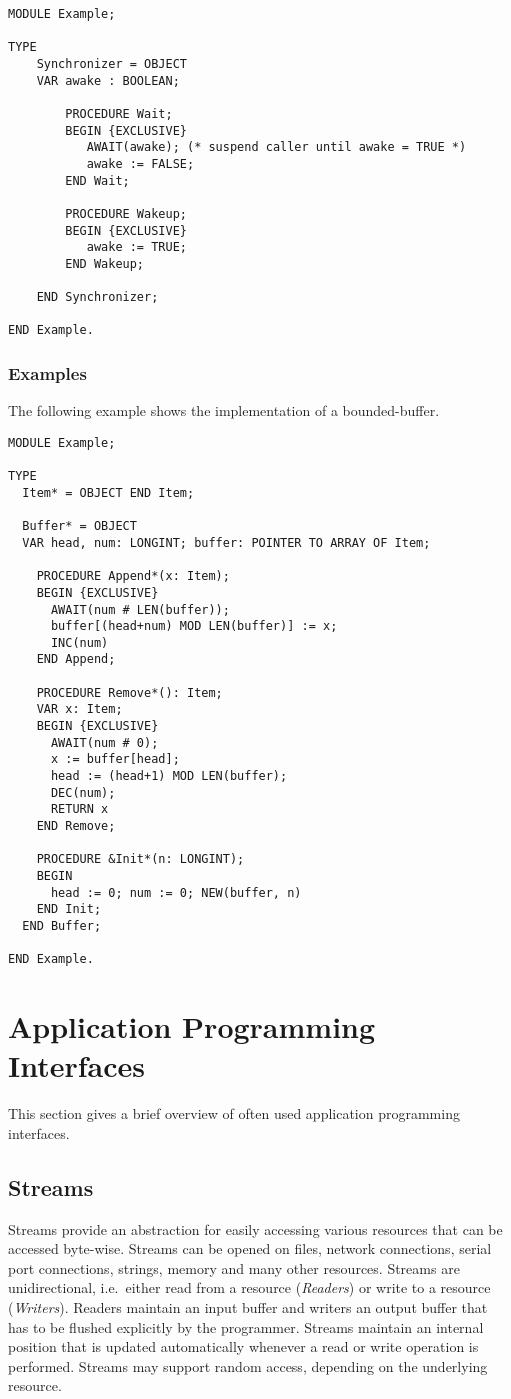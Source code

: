 \documentclass[a4paper,11pt]{article}
\begin{document}
\begin{lstlisting}[language=Oberon,frame=none,caption=Example of object synchronization]
MODULE Example;

TYPE
    Synchronizer = OBJECT
    VAR awake : BOOLEAN;

        PROCEDURE Wait;
        BEGIN {EXCLUSIVE}
           AWAIT(awake); (* suspend caller until awake = TRUE *)
           awake := FALSE;
        END Wait;

        PROCEDURE Wakeup;
        BEGIN {EXCLUSIVE}
           awake := TRUE;
        END Wakeup;

    END Synchronizer;

END Example.
\end{lstlisting}

\subsubsection{Examples}
The following example shows the implementation of a bounded-buffer.

\begin{lstlisting}[language=Oberon,frame=none,caption={Bounded-buffer}]
MODULE Example;

TYPE
  Item* = OBJECT END Item;

  Buffer* = OBJECT
  VAR head, num: LONGINT; buffer: POINTER TO ARRAY OF Item;

    PROCEDURE Append*(x: Item);
    BEGIN {EXCLUSIVE}
      AWAIT(num # LEN(buffer));
      buffer[(head+num) MOD LEN(buffer)] := x;
      INC(num)
    END Append;

    PROCEDURE Remove*(): Item;
    VAR x: Item;
    BEGIN {EXCLUSIVE}
      AWAIT(num # 0);
      x := buffer[head];
      head := (head+1) MOD LEN(buffer);
      DEC(num);
      RETURN x
    END Remove;

    PROCEDURE &Init*(n: LONGINT);
    BEGIN
      head := 0; num := 0; NEW(buffer, n)
    END Init;
  END Buffer;

END Example.
\end{lstlisting}

\section{Application Programming Interfaces}
This section gives a brief overview of often used application programming interfaces.

\subsection{Streams}
Streams provide an abstraction for easily accessing various resources that can be accessed byte-wise. Streams can be opened on files, network connections, serial port connections, strings, memory and many other resources.
Streams are unidirectional, i.e.\ either read from a resource (\emph{Readers}) or write to a resource (\emph{Writers}). Readers maintain an input buffer and writers an output buffer that has to be flushed explicitly by the programmer.
Streams maintain an internal position that is updated automatically whenever a read or write operation is performed. Streams may support random access, depending on the underlying resource.
\end{document}
